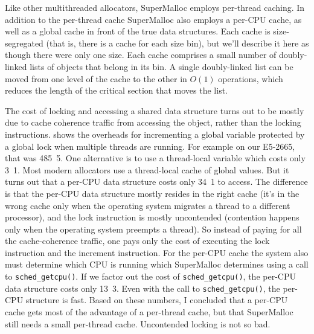 \documentclass[natbib,sort&compress]{sigplanconf}
\newcommand{\code}[1]{\texttt{#1}}
\begin{document}

Like other multithreaded allocators, SuperMalloc employs per-thread
caching.  In addition to the per-thread cache SuperMalloc also employs
a per-CPU cache, as well as a global cache in front of the true data
structures.  Each cache is size-segregated (that is, there is a cache
for each size bin), but we'll describe it here as though there were
only one size.  Each cache comprises a small number of doubly-linked
lists of objects that belong in its bin.  A single doubly-linked list
can be moved from one level of the cache to the other in $O(1)$
operations, which reduces the length of the critical section that
moves the list.

The cost of locking and accessing a shared data structure turns out to
be mostly due to cache coherence traffic from accessing the object,
rather than the locking instructions.   shows the
overheads for incrementing a global variable protected by a global
lock when multiple threads are running.  For example on our E5-2665,
that was \unit{485.5}\nano\second.  One alternative is to use a
thread-local variable which costs only \unit{3.1}\nano\second.  Most
modern allocators use a thread-local cache of global values.  But it
turns out that a per-CPU data structure costs only
\unit{34.1}\nano\second{} to access.  The difference is that the
per-CPU data structure mostly resides in the right cache (it's in the
wrong cache only when the operating system migrates a thread to a
different processor), and the lock instruction is mostly uncontended
(contention happens only when the operating system preempts a thread).
So instead of paying for all the cache-coherence traffic, one pays
only the cost of executing the lock instruction and the increment
instruction.  For the per-CPU cache the system also must determine
which CPU is running which SuperMalloc determines using a call to
\code{sched_getcpu()}.  If we factor out the cost of
\code{sched_getcpu()}, the per-CPU data structure costs only
\unit{13.3}\nano\second.  Even with the call to \code{sched_getcpu()},
the per-CPU structure is fast. Based on these numbers, I concluded
that a per-CPU cache gets most of the advantage of a per-thread cache,
but that SuperMalloc still needs a small per-thread cache.
Uncontended locking is not so bad.
\end{document}
